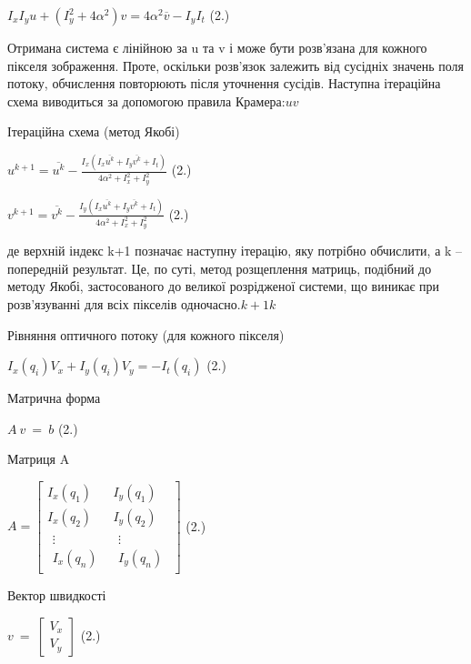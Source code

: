 \documentclass[
]{article}
\begin{document}
\(I_{x}I_{y}u + \left( I_{y}^{2} + 4\alpha^{2} \right)v = 4\alpha^{2}\overline{v} - I_{y}I_{t}\) (2.)

Отримана система є лінійною за u та v і може бути розв'язана для кожного пікселя зображення. Проте, оскільки розв'язок залежить від сусідніх значень поля потоку, обчислення повторюють після уточнення сусідів. Наступна ітераційна схема виводиться за допомогою правила Крамера:\(uv\)

Ітераційна схема (метод Якобі)

\(u^{k + 1} = \overline{u^{k}} - \frac{I_{x}\left( I_{x}\overline{u^{k}} + I_{y}\overline{v^{k}} + I_{t} \right)}{4\alpha^{2} + I_{x}^{2} + I_{y}^{2}}\) (2.)

\(v^{k + 1} = \overline{v^{k}} - \frac{I_{y}\left( I_{x}\overline{u^{k}} + I_{y}\overline{v^{k}} + I_{t} \right)}{4\alpha^{2} + I_{x}^{2} + I_{y}^{2}}\) (2.)

де верхній індекс k+1 позначає наступну ітерацію, яку потрібно обчислити, а k -- попередній результат. Це, по суті, метод розщеплення матриць, подібний до методу Якобі, застосованого до великої розрідженої системи, що виникає при розв'язуванні для всіх пікселів одночасно.\(k + 1k\)

Рівняння оптичного потоку (для кожного пікселя)

\(I_{x}\left( q_{i} \right)V_{x} + I_{y}\left( q_{i} \right)V_{y} = - I_{t}\left( q_{i} \right)\) (2.)

Матрична форма

\(A\ v\  = \ b\) (2.)

Матриця A

\(A = \begin{bmatrix}
I_{x}\left( q_{1} \right) & I_{y}\left( q_{1} \right) \\
I_{x}\left( q_{2} \right) & I_{y}\left( q_{2} \right) \\
\begin{matrix}
 \vdots \\
I_{x}\left( q_{n} \right)
\end{matrix} & \begin{matrix}
 \vdots \\
I_{y}\left( q_{n} \right)
\end{matrix}
\end{bmatrix}\) (2.)

Вектор швидкості

\(v\  = \ \begin{bmatrix}
V_{x} \\
V_{y}
\end{bmatrix}\) (2.)
\end{document}
